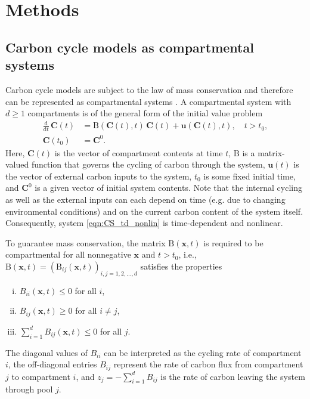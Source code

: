 \documentclass[11pt,a4paper]{article}
\renewcommand{\vec}[1]{\mathbf{#1}}
\newcommand{\tens}[1]{\mathrm{#1}}
\newcommand{\deriv}[1]{\frac{\mathrm{d}}{\mathrm{d}#1}}
\newcommand{\suml}{\sum\limits}
\begin{document}
\section{Methods}
\subsection{Carbon cycle models as compartmental systems}
Carbon cycle models are subject to the law of mass conservation and therefore can be represented as compartmental systems \citep{Anderson1983, Jacquez1993}. A compartmental system with $d\geq1$ compartments is of the general form of the initial value problem
    \begin{equation}\label{eqn:CS_td_nonlin}
        \begin{aligned}
            \deriv{t}\,\vec{C}(t) &= \tens{B}(\vec{C}(t),t)\,\vec{C}(t) + \vec{u}(\vec{C}(t),t),\quad t>t_0,\\
            \vec{C}(t_0) &= \vec{C}^0.
        \end{aligned}
    \end{equation}Here, $\vec{C}(t)$ is the vector of compartment contents at time $t$, $\tens{B}$ is a matrix-valued function that governs the cycling of carbon through the system, $\vec{u}(t)$ is the vector of external carbon inputs to the system, $t_0$ is some fixed initial time, and $\vec{C}^0$ is a given vector  of initial system contents. Note that the internal cycling as well as the external inputs can each depend on time (e.g. due to changing environmental conditions) and on the current carbon content of the system itself. Consequently, system \eqref{eqn:CS_td_nonlin} is time-dependent and nonlinear.
    
To guarantee mass conservation, the matrix $\tens{B}(\vec{x},t)$ is required to be compartmental 
for all nonnegative $\vec{x}$ and $t>t_0$, i.e., $\tens{B}(\vec{x},t)=(\tens{B}_{ij}(\vec{x},t))_{i,j=1,2,\ldots,d}$ satisfies the properties
    \begin{enumerate}[(i)]
        \item $B_{ii}(\vec{x},t)\leq0$ for all $i$,
        \item $B_{ij}(\vec{x},t)\geq0$ for all $i\neq j$,
        \item $\suml_{i=1}^d B_{ij}(\vec{x},t)\leq0$ for all $j$.
    \end{enumerate}
The diagonal values of $B_{ii}$ can be interpreted as the cycling rate of compartment $i$, the off-diagonal entries $B_{ij}$ represent the rate of carbon flux from compartment $j$ to compartment $i$, and $z_j=-\sum_{i=1}^d B_{ij}$ is the rate of carbon leaving the system through pool $j$.
    
\end{document}
